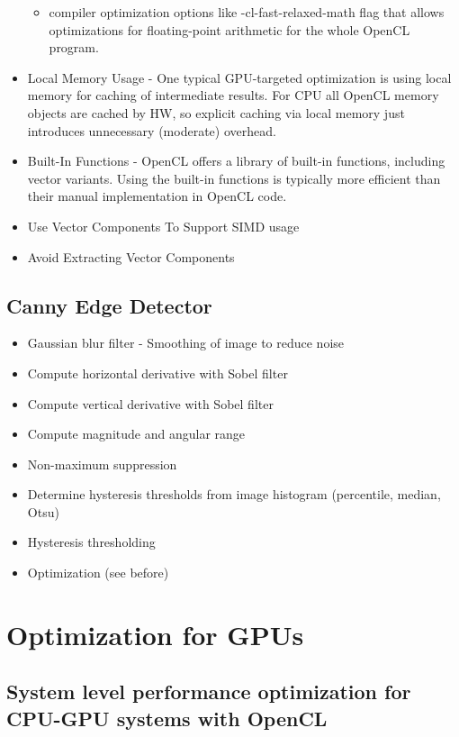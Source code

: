 \documentclass[paper=a4, fontsize=11pt]{scrartcl} %
\numberwithin{equation}{section} %
\numberwithin{figure}{section} %
\numberwithin{table}{section} %
\begin{document}
\begin{itemize}
\begin{itemize}
    \item compiler optimization options like -cl-fast-relaxed-math flag that allows optimizations for floating-point arithmetic for the whole OpenCL program.
  \end{itemize}
  \item Local Memory Usage - One typical GPU-targeted optimization is using local memory for caching of intermediate results. For CPU all OpenCL memory objects are cached by HW, so explicit caching via local memory just introduces unnecessary (moderate) overhead.
  \item Built-In Functions - OpenCL offers a library of built-in functions, including vector variants. Using the built-in functions is typically more efficient than their manual implementation in OpenCL code.
  \item Use Vector Components To Support SIMD usage
  \item Avoid Extracting Vector Components
\end{itemize}

\subsection{Canny Edge Detector}

\begin{itemize}
  \item Gaussian blur filter - Smoothing of image to reduce noise
  \item Compute horizontal derivative with Sobel filter
  \item Compute vertical derivative with Sobel filter
  \item Compute magnitude and angular range
  \item Non-maximum suppression
  \item Determine hysteresis thresholds from image histogram (percentile, median, Otsu)
  \item Hysteresis thresholding
  \item Optimization (see before)
\end{itemize}

\section{Optimization for GPUs}

\subsection{System level performance optimization for CPU-GPU systems with
OpenCL}
\end{document}
